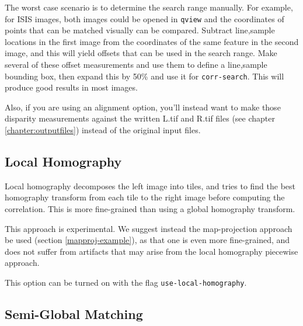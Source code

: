 The worst case scenario is to determine the search range manually. For
example, for ISIS images, both images could be opened in \texttt{qview}
and the coordinates of points that can be matched visually can be
compared. Subtract line,sample locations in the first image from the
coordinates of the same feature in the second image, and this will yield
offsets that can be used in the search range.  Make several of these
offset measurements and use them to define a line,sample bounding box,
then expand this by 50\% and use it for \texttt{corr-search}.  This will
produce good results in most images.

Also, if you are using an alignment option, you'll instead want to
make those disparity measurements against the written L.tif and R.tif
files (see chapter \ref{chapter:outputfiles}) instead of the original input files.

\subsection{Local Homography}
\label{sec:local_hom}

Local homography decomposes the left image into tiles,
and tries to find the best homography transform from each 
tile to the right image before computing the correlation.
This is more fine-grained than using a global homography transform.

This approach is experimental. We suggest instead the map-projection
approach be used (section \ref{mapproj-example}), as that one
is even more fine-grained, and does not suffer from artifacts
that may arise from the local homography piecewise approach.

This option can be turned on with the flag \texttt{use-local-homography}.

\subsection{Semi-Global Matching}
\label{sec:sgm}

